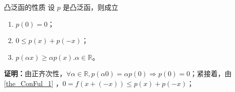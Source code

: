 \begin{theorem}{凸泛函的性质}
设 $p$ 是凸泛函，则成立
\begin{enumerate}
\item $p(0)=0$；
\item $0\leq p(x)+p(-x)$；
\item $p(\alpha x)\geq\alpha p(x).\alpha\in\mathbb R$。
\end{enumerate}
\end{theorem}

\textbf{证明：}由正齐次性，$\forall \alpha\in\mathbb R,p(\alpha 0)=\alpha p(0)\Rightarrow p(0)=0$；紧接着，由\autoref{the_ConFul_1} ，$0=f(x+(-x))\leq p(x)+p(-x)$；











